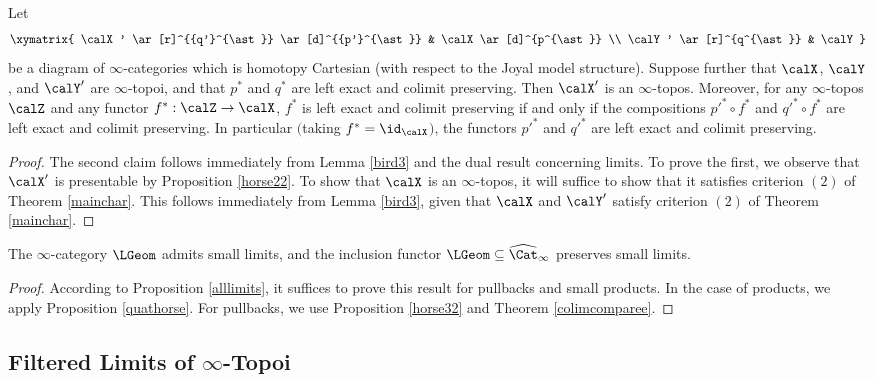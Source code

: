 \begin{proposition}\label{horse32}
Let $$ \xymatrix{ \calX' \ar[r]^{{q'}^{\ast}} \ar[d]^{{p'}^{\ast}} & \calX \ar[d]^{p^{\ast}} \\
\calY' \ar[r]^{q^{\ast}} & \calY }$$
be a diagram of $\infty$-categories which is homotopy Cartesian (with respect to the Joyal model structure). Suppose further that $\calX$, $\calY$, and $\calY'$ are $\infty$-topoi, and that
$p^{\ast}$ and $q^{\ast}$ are left exact and colimit preserving. Then $\calX'$ is an $\infty$-topos. Moreover, for any $\infty$-topos $\calZ$ and any functor $f^{\ast}: \calZ \rightarrow \calX$, $f^{\ast}$ is left exact and colimit preserving if and only if the compositions ${p'}^{\ast} \circ f^{\ast}$ and ${q'}^{\ast} \circ f^{\ast}$ are left exact and colimit preserving. In particular $($taking $f^{\ast} = \id_{\calX}${}$)$, the functors
${p'}^{\ast}$ and ${q'}^{\ast}$ are left exact and colimit preserving.
\end{proposition}

\begin{proof}
The second claim follows immediately from Lemma \ref{bird3} and the dual result concerning limits.
To prove the first, we observe that $\calX'$ is presentable by Proposition \ref{horse22}. To show that
$\calX$ is an $\infty$-topos, it will suffice to show that it satisfies criterion $(2)$ of Theorem \ref{mainchar}. This follows immediately from Lemma \ref{bird3}, given that
$\calX$ and $\calY'$ satisfy criterion $(2)$ of Theorem \ref{mainchar}.
\end{proof}

\begin{proposition}\label{colimtopoi}
The $\infty$-category $\LGeom$ admits small limits, and the inclusion functor
$\LGeom \subseteq \widehat{\Cat}_{\infty}$ preserves small limits.
\end{proposition}

\begin{proof}
According to Proposition \ref{alllimits}, it suffices to prove this result for pullbacks and small products. In the case of products, we apply Proposition \ref{quathorse}. For pullbacks, we
use Proposition \ref{horse32} and Theorem \ref{colimcomparee}.
\end{proof}

\subsection{Filtered Limits of $\infty$-Topoi}\label{inftyfiltlim}

